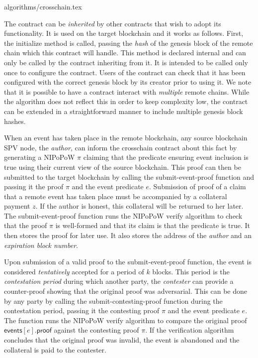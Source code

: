 {algorithms/crosschain.tex}

The contract can be \emph{inherited} by other contracts that wish to adopt its
functionality. It is used on the target blockchain and it works as follows.
First, the \textsf{initialize} method is called, passing the \emph{hash} of the
genesis block of the remote chain which this contract will handle. This method
is declared \textsf{internal} and can only be called by the contract inheriting
from it. It is intended to be called only once to configure the contract. Users
of the contract can check that it has been configured with the correct genesis
block by its creator prior to using it. We note that it is possible to have a
contract interact with \emph{multiple} remote chains. While the algorithm does
not reflect this in order to keep complexity low, the contract can be extended
in a straightforward manner to include multiple genesis block hashes.

When an event has taken place in the remote blockchain, any source blockchain
SPV node, the \emph{author}, can inform the \textsf{crosschain} contract about
this fact by generating a NIPoPoW $\pi$ claiming that the predicate ensuring
event inclusion is \textsf{true} using their current view of the source
blockchain. This proof can then be submitted to the target blockchain by calling
the \textsf{submit-event-proof} function and passing it the proof $\pi$ and the
event predicate $e$. Submission of proof of a claim that a remote event has
taken place must be accompanied by a collateral payment $z$. If the author
is honest, this collateral will be returned to her later. The
\textsf{submit-event-proof} function runs the NIPoPoW \textsf{verify} algorithm
to check that the proof $\pi$ is well-formed and that its claim is that the
predicate is \textsf{true}. It then stores the proof for later use. It also
stores the address of the \emph{author} and an \emph{expiration block number}.

Upon submission of a valid proof to the \textsf{submit-event-proof} function,
the event is considered \emph{tentatively} accepted for a period of $k$ blocks.
This period is the \emph{contestation period} during which another party, the
\emph{contester} can provide a counter-proof showing that the original proof was
adversarial. This can be done by any party by calling the
\textsf{submit-contesting-proof} function during the contestation period,
passing it the contesting proof $\pi$ and the event predicate $e$. The function
runs the NIPoPoW \textsf{verify} algorithm to compare the original proof
$\textsf{events}[e].\textsf{proof}$ against the contesting proof $\pi$. If the
verification algorithm concludes that the original proof was invalid, the event
is abandoned and the collateral is paid to the contester.

